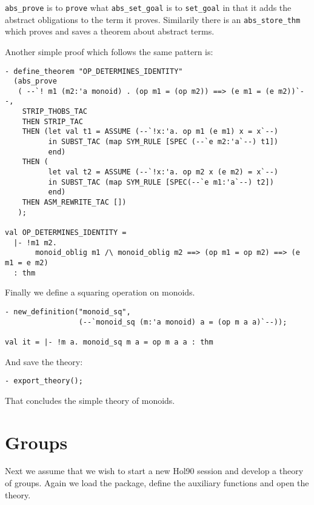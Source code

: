\verb!abs_prove! is to \verb!prove! what \verb!abs_set_goal! is to
\verb!set_goal! in that it adds the abstract obligations to the term it
proves. Similarily there is an \verb!abs_store_thm! which proves and
saves a theorem about abstract terms.

Another simple proof which follows the same pattern is:
    
\begin{small}
\begin{verbatim}
- define_theorem "OP_DETERMINES_IDENTITY"
  (abs_prove
   ( --`! m1 (m2:'a monoid) . (op m1 = (op m2)) ==> (e m1 = (e m2))`--,
    STRIP_THOBS_TAC
    THEN STRIP_TAC
    THEN (let val t1 = ASSUME (--`!x:'a. op m1 (e m1) x = x`--)
          in SUBST_TAC (map SYM_RULE [SPEC (--`e m2:'a`--) t1])
          end)
    THEN (
          let val t2 = ASSUME (--`!x:'a. op m2 x (e m2) = x`--)
          in SUBST_TAC (map SYM_RULE [SPEC(--`e m1:'a`--) t2])
          end)
    THEN ASM_REWRITE_TAC [])
   );
  
val OP_DETERMINES_IDENTITY =
  |- !m1 m2.
       monoid_oblig m1 /\ monoid_oblig m2 ==> (op m1 = op m2) ==> (e m1 = e m2)
  : thm
\end{verbatim}
\end{small}

Finally we define a squaring operation on monoids.

\begin{small}
\begin{verbatim}
- new_definition("monoid_sq",
                 (--`monoid_sq (m:'a monoid) a = (op m a a)`--));

val it = |- !m a. monoid_sq m a = op m a a : thm
\end{verbatim}
\end{small}

And save the theory:

\begin{small}
\begin{verbatim}
- export_theory();
\end{verbatim}
\end{small}

That concludes the simple theory of monoids. 

\section{Groups}

Next we assume that we wish to start a new Hol90 session and develop a
theory of groups. Again we load the package, define the auxiliary
functions and open the theory.

